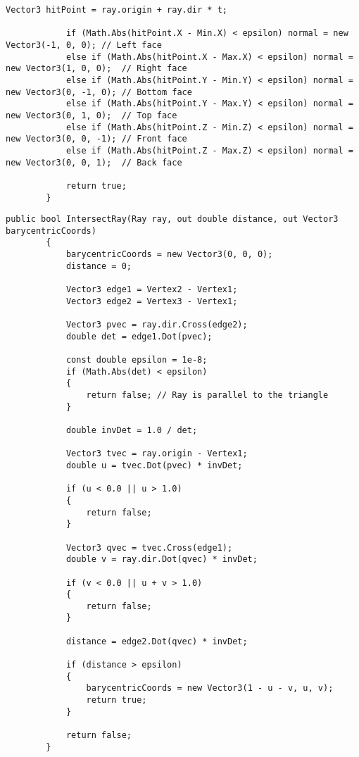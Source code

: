 \begin{center}
\begin{lstlisting}[label={lst:WallIntersection}, captionpos={b}, caption={Алгоритм поиска точки пересечения луча с кубом}]
			Vector3 hitPoint = ray.origin + ray.dir * t;
			
			if (Math.Abs(hitPoint.X - Min.X) < epsilon) normal = new Vector3(-1, 0, 0); // Left face
			else if (Math.Abs(hitPoint.X - Max.X) < epsilon) normal = new Vector3(1, 0, 0);  // Right face
			else if (Math.Abs(hitPoint.Y - Min.Y) < epsilon) normal = new Vector3(0, -1, 0); // Bottom face
			else if (Math.Abs(hitPoint.Y - Max.Y) < epsilon) normal = new Vector3(0, 1, 0);  // Top face
			else if (Math.Abs(hitPoint.Z - Min.Z) < epsilon) normal = new Vector3(0, 0, -1); // Front face
			else if (Math.Abs(hitPoint.Z - Max.Z) < epsilon) normal = new Vector3(0, 0, 1);  // Back face
			
			return true;
		}
	\end{lstlisting}
\end{center}


\begin{center}
	\begin{lstlisting}[label={lst:TriangleIntersection}, captionpos={b}, caption={Алгоритм поиска точки пересечения луча с треугольным полигоном}]
		public bool IntersectRay(Ray ray, out double distance, out Vector3 barycentricCoords)
		{
			barycentricCoords = new Vector3(0, 0, 0);
			distance = 0;
			
			Vector3 edge1 = Vertex2 - Vertex1;
			Vector3 edge2 = Vertex3 - Vertex1;
			
			Vector3 pvec = ray.dir.Cross(edge2);
			double det = edge1.Dot(pvec);
			
			const double epsilon = 1e-8;
			if (Math.Abs(det) < epsilon)
			{
				return false; // Ray is parallel to the triangle
			}
			
			double invDet = 1.0 / det;
			
			Vector3 tvec = ray.origin - Vertex1;
			double u = tvec.Dot(pvec) * invDet;
			
			if (u < 0.0 || u > 1.0)
			{
				return false;
			}
			
			Vector3 qvec = tvec.Cross(edge1);
			double v = ray.dir.Dot(qvec) * invDet;
			
			if (v < 0.0 || u + v > 1.0)
			{
				return false;
			}
			
			distance = edge2.Dot(qvec) * invDet;
			
			if (distance > epsilon)
			{
				barycentricCoords = new Vector3(1 - u - v, u, v);
				return true;
			}
			
			return false;
		}
	\end{lstlisting}
\end{center}

